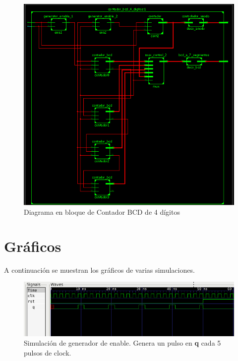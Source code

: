 \documentclass[10pt,a4paper]{article}
\begin{document}
\begin{figure}[h!]
\begin{center}
\includegraphics[scale=0.4]{./graficos/diagrama_contador_bcd_4.png}
\end{center}
\caption{Diagrama en bloque de Contador BCD de 4 dígitos}
\label{grafico1}
\end{figure}

\section*{Gráficos}
A continuación se muestran los gráficos de varias simulaciones.

\begin{figure}[h!]
\begin{center}
\includegraphics[scale=0.5]{./graficos/generador_enable.png}
\end{center}
\caption{Simulación de generador de enable. Genera un pulso en \textbf{q} 
	cada 5 pulsos de clock.} 
\label{grafico_enable}
\end{figure}
\end{document}
